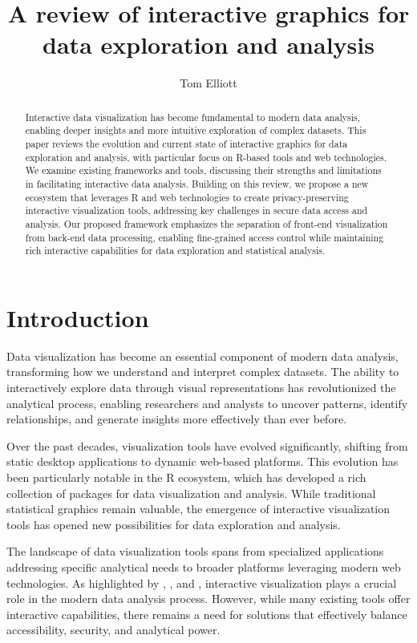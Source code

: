 \documentclass{article}
\title{A review of interactive graphics for data exploration and analysis}
\author{Tom Elliott}
\affil{iNZight Analytics Ltd}
\date{}
\begin{document}
\maketitle

\begin{abstract}
Interactive data visualization has become fundamental to modern data analysis, enabling deeper insights and more intuitive exploration of complex datasets. This paper reviews the evolution and current state of interactive graphics for data exploration and analysis, with particular focus on R-based tools and web technologies. We examine existing frameworks and tools, discussing their strengths and limitations in facilitating interactive data analysis. Building on this review, we propose a new ecosystem that leverages R and web technologies to create privacy-preserving interactive visualization tools, addressing key challenges in secure data access and analysis. Our proposed framework emphasizes the separation of front-end visualization from back-end data processing, enabling fine-grained access control while maintaining rich interactive capabilities for data exploration and statistical analysis.
\end{abstract}

\section{Introduction}
\label{sec:intro}

Data visualization has become an essential component of modern data analysis, transforming how we understand and interpret complex datasets. The ability to interactively explore data through visual representations has revolutionized the analytical process, enabling researchers and analysts to uncover patterns, identify relationships, and generate insights more effectively than ever before.

Over the past decades, visualization tools have evolved significantly, shifting from static desktop applications to dynamic web-based platforms. This evolution has been particularly notable in the R ecosystem, which has developed a rich collection of packages for data visualization and analysis. While traditional statistical graphics remain valuable, the emergence of interactive visualization tools has opened new possibilities for data exploration and analysis.

The landscape of data visualization tools spans from specialized applications addressing specific analytical needs to broader platforms leveraging modern web technologies. As highlighted by \cite{Cook2007}, \cite{Theus2014}, and \cite{Ward2015}, interactive visualization plays a crucial role in the modern data analysis process. However, while many existing tools offer interactive capabilities, there remains a need for solutions that effectively balance accessibility, security, and analytical power.
\end{document}
